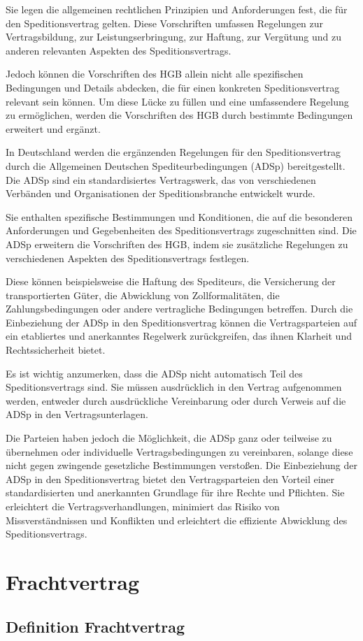 Sie legen die allgemeinen rechtlichen Prinzipien und Anforderungen fest, die für den Speditionsvertrag gelten.
Diese Vorschriften umfassen Regelungen zur Vertragsbildung, zur Leistungserbringung, zur Haftung, zur Vergütung und zu anderen relevanten Aspekten des Speditionsvertrags.

Jedoch können die Vorschriften des HGB allein nicht alle spezifischen Bedingungen und Details abdecken, die für einen konkreten Speditionsvertrag relevant sein können.
Um diese Lücke zu füllen und eine umfassendere Regelung zu ermöglichen, werden die Vorschriften des HGB durch bestimmte Bedingungen erweitert und ergänzt.

In Deutschland werden die ergänzenden Regelungen für den Speditionsvertrag durch die Allgemeinen Deutschen Spediteurbedingungen (ADSp) bereitgestellt.
Die ADSp sind ein standardisiertes Vertragswerk, das von verschiedenen Verbänden und Organisationen der Speditionsbranche entwickelt wurde.

Sie enthalten spezifische Bestimmungen und Konditionen, die auf die besonderen Anforderungen und Gegebenheiten des Speditionsvertrags zugeschnitten sind.
Die ADSp erweitern die Vorschriften des HGB, indem sie zusätzliche Regelungen zu verschiedenen Aspekten des Speditionsvertrags festlegen.

Diese können beispielsweise die Haftung des Spediteurs, die Versicherung der transportierten Güter, die Abwicklung von Zollformalitäten, die Zahlungsbedingungen oder andere vertragliche Bedingungen betreffen.
Durch die Einbeziehung der ADSp in den Speditionsvertrag können die Vertragsparteien auf ein etabliertes und anerkanntes Regelwerk zurückgreifen, das ihnen Klarheit und Rechtssicherheit bietet.

Es ist wichtig anzumerken, dass die ADSp nicht automatisch Teil des Speditionsvertrags sind.
Sie müssen ausdrücklich in den Vertrag aufgenommen werden, entweder durch ausdrückliche Vereinbarung oder durch Verweis auf die ADSp in den Vertragsunterlagen.

Die Parteien haben jedoch die Möglichkeit, die ADSp ganz oder teilweise zu übernehmen oder individuelle Vertragsbedingungen zu vereinbaren, solange diese nicht gegen zwingende gesetzliche Bestimmungen verstoßen.
Die Einbeziehung der ADSp in den Speditionsvertrag bietet den Vertragsparteien den Vorteil einer standardisierten und anerkannten Grundlage für ihre Rechte und Pflichten.
Sie erleichtert die Vertragsverhandlungen, minimiert das Risiko von Missverständnissen und Konflikten und erleichtert die effiziente Abwicklung des Speditionsvertrags.

\chapter{Frachtvertrag}

\section[Definition]{Definition Frachtvertrag}

